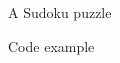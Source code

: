 \begin{figure}[h]
\centering
  \sudokuexampleone
\caption{A Sudoku puzzle}
\end{figure}

\begin{figure}[h]

\caption{Code example}
\end{figure}
